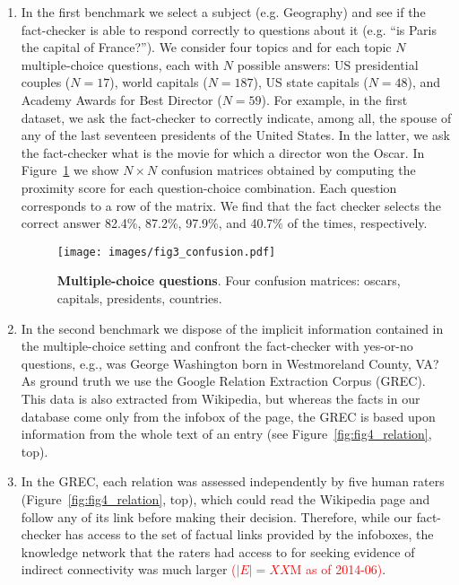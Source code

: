 \documentclass[10pt, letterpaper, english]{nature}
\begin{document}
\begin{enumerate}
    \item In the first benchmark we select a subject (e.g. Geography) and see if
        the fact-checker is able to respond correctly to questions about it
        (e.g. ``is Paris the capital of France?''). We consider four topics and
        for each topic $N$ multiple-choice questions, each with $N$ possible
        answers: US presidential couples ($N = 17$), world capitals ($N = 187$),
        US state capitals ($N = 48$), and Academy Awards for Best Director ($N =
        59$). For example, in the first dataset, we ask the fact-checker to
        correctly indicate, among all, the spouse of any of the last seventeen
        presidents of the United States. In the latter, we ask the fact-checker
        what is the movie for which a director won the Oscar. In
        Figure~\ref{fig:fig3_confusion} we show $N\times N$ confusion matrices
        obtained by computing the proximity score for each question-choice
        combination. Each question corresponds to a row of the matrix. We find
        that the fact checker selects the correct answer 82.4\%, 87.2\%, 97.9\%,
        and 40.7\% of the times, respectively. 

\begin{figure}
    \centering
    \texttt{[image: images/fig3\_confusion.pdf]}
    \caption{\textbf{Multiple-choice questions}. Four confusion matrices:
    oscars, capitals, presidents, countries.} 
    \label{fig:fig3_confusion}
\end{figure}

    \item In the second benchmark we dispose of the implicit information
        contained in the multiple-choice setting and confront the fact-checker
        with yes-or-no questions, e.g., was George Washington born in
        Westmoreland County, VA? As ground truth we use the Google Relation
        Extraction Corpus (GREC)\cite{Google2013}. This data is also extracted
        from Wikipedia, but whereas the facts in our database come only from the
        infobox of the page, the GREC is based upon information from the whole
        text of an entry (see Figure~\ref{fig:fig4_relation}, top). 
        
    \item In the GREC, each relation was assessed independently by five human
        raters (Figure~\ref{fig:fig4_relation}, top), which could read the
        Wikipedia page and follow any of its link before making their decision.
        Therefore, while our fact-checker has access to the set of factual links
        provided by the infoboxes, the knowledge network that the raters had
        access to for seeking evidence of indirect connectivity was much larger
        \textcolor{red}{($|E| = XX\mathrm{M}$ as of 2014-06)}.
        

\end{enumerate}
\end{document}
